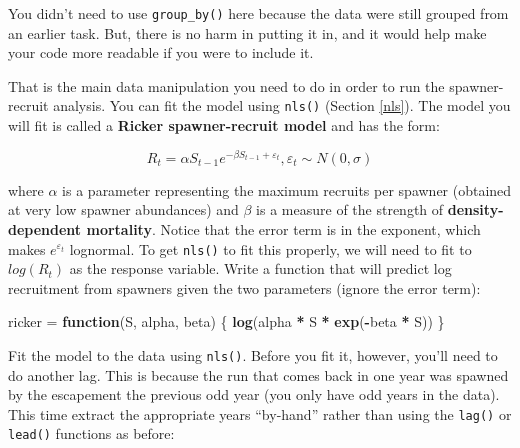 \documentclass[]{book}
\newenvironment{Shaded}{\begin{snugshade}}{\end{snugshade}}
\newcommand{\CommentTok}[1]{\textcolor[rgb]{0.56,0.35,0.01}{\textit{#1}}}
\newcommand{\ControlFlowTok}[1]{\textcolor[rgb]{0.13,0.29,0.53}{\textbf{#1}}}
\newcommand{\DecValTok}[1]{\textcolor[rgb]{0.00,0.00,0.81}{#1}}
\newcommand{\KeywordTok}[1]{\textcolor[rgb]{0.13,0.29,0.53}{\textbf{#1}}}
\newcommand{\NormalTok}[1]{#1}
\newcommand{\OperatorTok}[1]{\textcolor[rgb]{0.81,0.36,0.00}{\textbf{#1}}}
\newcommand{\StringTok}[1]{\textcolor[rgb]{0.31,0.60,0.02}{#1}}
\begin{document}
You didn't need to use \texttt{group\_by()} here because the data were still grouped from an earlier task. But, there is no harm in putting it in, and it would help make your code more readable if you were to include it.

That is the main data manipulation you need to do in order to run the spawner-recruit analysis. You can fit the model using \texttt{nls()} (Section \ref{nls}). The model you will fit is called a \textbf{Ricker spawner-recruit model} and has the form:

\begin{equation}
  R_t = \alpha S_{t-1} e^{-\beta S_{t-1} + \varepsilon_t} ,\varepsilon_t \sim N(0,\sigma)
\label{eq:ricker-ch5}
\end{equation}

where \(\alpha\) is a parameter representing the maximum recruits per spawner (obtained at very low spawner abundances) and \(\beta\) is a measure of the strength of \textbf{density-dependent mortality}. Notice that the error term is in the exponent, which makes \(e^{\varepsilon_t}\) lognormal. To get \texttt{nls()} to fit this properly, we will need to fit to \(log(R_t)\) as the response variable. Write a function that will predict log recruitment from spawners given the two parameters (ignore the error term):

\begin{Shaded}
\begin{Highlighting}[]
\NormalTok{ricker =}\StringTok{ }\ControlFlowTok{function}\NormalTok{(S, alpha, beta) \{}
  \KeywordTok{log}\NormalTok{(alpha }\OperatorTok{*}\StringTok{ }\NormalTok{S }\OperatorTok{*}\StringTok{ }\KeywordTok{exp}\NormalTok{(}\OperatorTok{-}\NormalTok{beta }\OperatorTok{*}\StringTok{ }\NormalTok{S))}
\NormalTok{\}}
\end{Highlighting}
\end{Shaded}

Fit the model to the data using \texttt{nls()}. Before you fit it, however, you'll need to do another lag. This is because the run that comes back in one year was spawned by the escapement the previous odd year (you only have odd years in the data). This time extract the appropriate years ``by-hand'' rather than using the \texttt{lag()} or \texttt{lead()} functions as before:

\begin{Shaded}
\end{Shaded}
\end{document}
